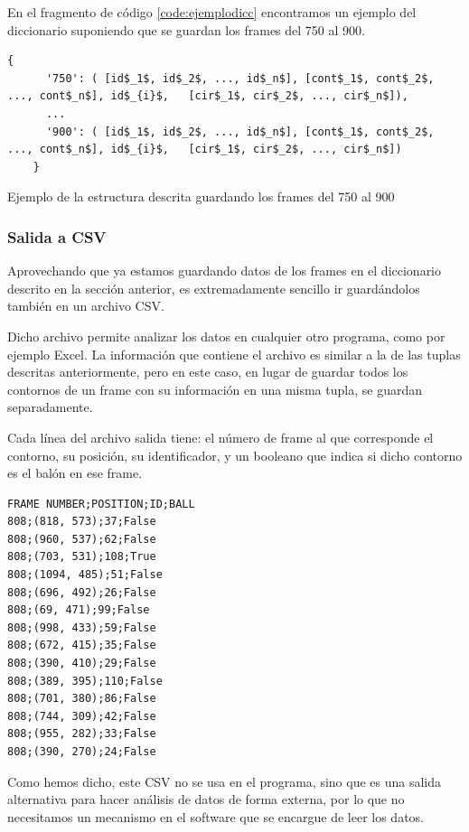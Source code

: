 En el fragmento de código \ref{code:ejemplodicc} encontramos un ejemplo del diccionario suponiendo que se guardan los frames del 750 al 900. 

\begin{lstfloat}
  \begin{lstlisting}[mathescape]
    {
      '750': ( [id$_1$, id$_2$, ..., id$_n$], [cont$_1$, cont$_2$, ..., cont$_n$], id$_{i}$,   [cir$_1$, cir$_2$, ..., cir$_n$]),
      ...
      '900': ( [id$_1$, id$_2$, ..., id$_n$], [cont$_1$, cont$_2$, ..., cont$_n$], id$_{i}$,   [cir$_1$, cir$_2$, ..., cir$_n$])
    }
  \end{lstlisting}
  \caption{ Ejemplo de la estructura descrita guardando los frames del 750 al 900}
  \label{code:ejemplodicc}
\end{lstfloat}


\subsubsection*{Salida a CSV}

Aprovechando que ya estamos guardando datos de los frames en el diccionario descrito en la sección anterior, es extremadamente sencillo ir guardándolos también en un archivo CSV.

Dicho archivo permite analizar los datos en cualquier otro programa, como por ejemplo Excel. La información que contiene el archivo es similar a la de las tuplas descritas anteriormente, pero en este caso, en lugar de guardar todos los contornos de un frame con su información en una misma tupla, se guardan separadamente.

Cada línea del archivo salida tiene: el número de frame al que corresponde el contorno, su posición, su identificador, y un booleano que indica si dicho contorno es el balón en ese frame.
\begin{lstlisting}
FRAME NUMBER;POSITION;ID;BALL
808;(818, 573);37;False
808;(960, 537);62;False
808;(703, 531);108;True
808;(1094, 485);51;False
808;(696, 492);26;False
808;(69, 471);99;False
808;(998, 433);59;False
808;(672, 415);35;False
808;(390, 410);29;False
808;(389, 395);110;False
808;(701, 380);86;False
808;(744, 309);42;False
808;(955, 282);33;False
808;(390, 270);24;False
\end{lstlisting}

Como hemos dicho, este CSV no se usa en el programa, sino que es una salida alternativa para hacer análisis de datos de forma externa, por lo que no necesitamos un mecanismo en el software que se encargue de leer los datos.

